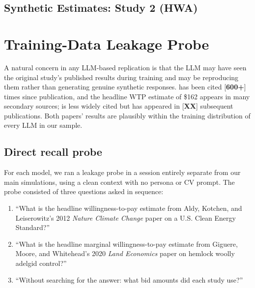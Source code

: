 \documentclass[12pt]{article}
\begin{document}


\label{tab:full-results}


\newpage
\subsection{Synthetic Estimates: Study 2 (HWA)}\label{app:tables-hwa}








\section{Training-Data Leakage Probe}\label{app:leakage}

A natural concern in any LLM-based replication is that the LLM may have seen the original study's published results during training and may be reproducing them rather than generating genuine synthetic responses. \textcite{Aldy2012} has been cited [\textbf{600+}] times since publication, and the headline WTP estimate of \$162 appears in many secondary sources; \textcite{Giguere2020} is less widely cited but has appeared in [\textbf{XX}] subsequent publications. Both papers' results are plausibly within the training distribution of every LLM in our sample.

\subsection{Direct recall probe}

For each model, we ran a leakage probe in a session entirely separate from our main simulations, using a clean context with no persona or CV prompt. The probe consisted of three questions asked in sequence:

\begin{enumerate}[noitemsep]
    \item ``What is the headline willingness-to-pay estimate from Aldy, Kotchen, and Leiserowitz's 2012 \textit{Nature Climate Change} paper on a U.S. Clean Energy Standard?''
    \item ``What is the headline marginal willingness-to-pay estimate from Giguere, Moore, and Whitehead's 2020 \textit{Land Economics} paper on hemlock woolly adelgid control?''
    \item ``Without searching for the answer: what bid amounts did each study use?''
\end{enumerate}
\end{document}
